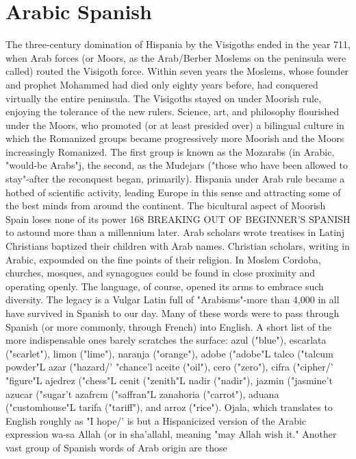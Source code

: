 \documentclass[14pt,a4paper,oneside]{memoir}
\begin{document}
{{{{\section{Arabic Spanish}

The three-century domination of Hispania by the Visigoths
ended in the year 711, when Arab forces (or Moors, as the Arab/Berber
Moslems on the peninsula were called) routed the Visigoth force.
Within seven years the Moslems, whose founder and prophet Mohammed had died only eighty years before, had conquered virtually the entire peninsula. The Visigoths stayed on under Moorish rule, enjoying
the tolerance of the new rulers. Science, art, and philosophy flourished
under the Moors, who promoted (or at least presided over) a bilingual
culture in which the Romanized groups became progressively more
Moorish and the Moors increasingly Romanized. The first group is
known as the Mozarabs (in Arabic, "would-be Arabs"j, the second, as
the Mudejars ("those who have been allowed to stay"-after the reconquest began, primarily). Hispania under Arab rule became a hotbed of
scientific activity, leading Europe in this sense and attracting some of
the best minds from around the continent.
The bicultural aspect of Moorish Spain loses none of its power
168 BREAKING OUT OF BEGINNER'S SPANISH
to astound more than a millennium later. Arab scholars wrote treatises
in Latinj Christians baptized their children with Arab names. Christian scholars, writing in Arabic, expounded on the fine points of their
religion. In Moslem Cordoba, churches, mosques, and synagogues
could be found in close proximity and operating openly.
The language, of course, opened its arms to embrace such
diversity. The legacy is a Vulgar Latin full of "Arabisms"-more
than 4,000 in all have survived in Spanish to our day. Many of these
words were to pass through Spanish (or more commonly, through
French) into English. A short list of the more indispensable ones
barely scratches the surface: azul ("blue"), escarlata ("scarlet"), limon ("lime"), naranja ("orange"), adobe ("adobe"L talco ("talcum
powder"L azar ("hazard/' "chance'l aceite ("oil"), cero ("zero"), cifra
("cipher/' "figure"L ajedrez ("chess"L cenit ("zenith"L nadir ("nadir"),
jazmin ("jasmine't azucar ("sugar't azafrcm ("saffran"L zanahoria
("carrot"), aduana ("customhouse"L tarifa ("tariff"), and arroz ("rice").
Ojala, which translates to English roughly as "I hope/' is but
a Hispanicized version of the Arabic expression wa-sa Allah (or in
sha'allahl, meaning "may Allah wish it."
Another vast group of Spanish words of Arab origin are those
}}}}
\end{document}

